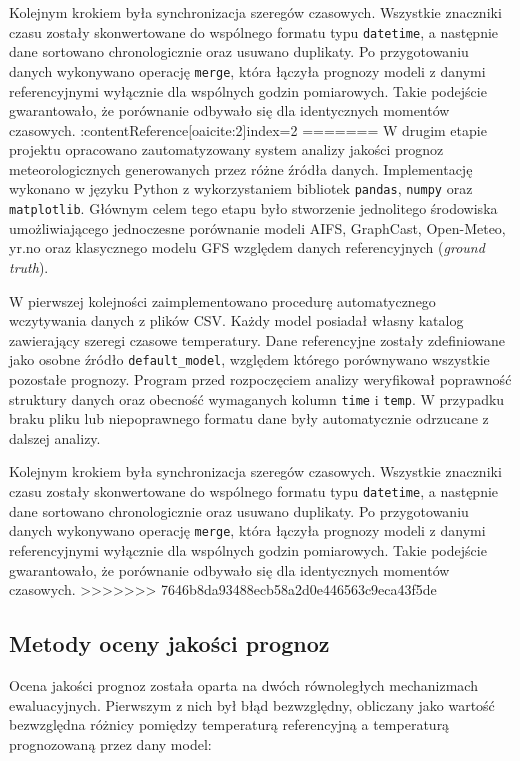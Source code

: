 \documentclass[a4paper,12pt]{article}
\begin{document}
Kolejnym krokiem była synchronizacja szeregów czasowych. Wszystkie znaczniki czasu zostały skonwertowane do wspólnego formatu typu \texttt{datetime}, a następnie dane sortowano chronologicznie oraz usuwano duplikaty. Po przygotowaniu danych wykonywano operację \texttt{merge}, która łączyła prognozy modeli z danymi referencyjnymi wyłącznie dla wspólnych godzin pomiarowych. Takie podejście gwarantowało, że porównanie odbywało się dla identycznych momentów czasowych. :contentReference[oaicite:2]{index=2}
=======
W drugim etapie projektu opracowano zautomatyzowany system analizy jakości prognoz meteorologicznych generowanych przez różne źródła danych. Implementację wykonano w języku Python z wykorzystaniem bibliotek \texttt{pandas}, \texttt{numpy} oraz \texttt{matplotlib}. Głównym celem tego etapu było stworzenie jednolitego środowiska umożliwiającego jednoczesne porównanie modeli AIFS, GraphCast, Open-Meteo, yr.no oraz klasycznego modelu GFS względem danych referencyjnych (\textit{ground truth}). 

\noindent
W pierwszej kolejności zaimplementowano procedurę automatycznego wczytywania danych z plików CSV. Każdy model posiadał własny katalog zawierający szeregi czasowe temperatury. Dane referencyjne zostały zdefiniowane jako osobne źródło \texttt{default\_model}, względem którego porównywano wszystkie pozostałe prognozy. Program przed rozpoczęciem analizy weryfikował poprawność struktury danych oraz obecność wymaganych kolumn \texttt{time} i \texttt{temp}. W przypadku braku pliku lub niepoprawnego formatu dane były automatycznie odrzucane z dalszej analizy. 

\noindent
Kolejnym krokiem była synchronizacja szeregów czasowych. Wszystkie znaczniki czasu zostały skonwertowane do wspólnego formatu typu \texttt{datetime}, a następnie dane sortowano chronologicznie oraz usuwano duplikaty. Po przygotowaniu danych wykonywano operację \texttt{merge}, która łączyła prognozy modeli z danymi referencyjnymi wyłącznie dla wspólnych godzin pomiarowych. Takie podejście gwarantowało, że porównanie odbywało się dla identycznych momentów czasowych.
>>>>>>> 7646b8da93488ecb58a2d0e446563c9eca43f5de

\subsection{Metody oceny jakości prognoz}

Ocena jakości prognoz została oparta na dwóch równoległych mechanizmach ewaluacyjnych. Pierwszym z nich był błąd bezwzględny, obliczany jako wartość bezwzględna różnicy pomiędzy temperaturą referencyjną a temperaturą prognozowaną przez dany model:
\end{document}
